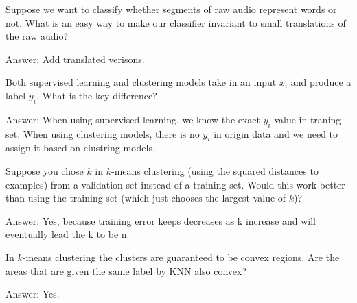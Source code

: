 \documentclass{article}
\def\ans#1{\par\gre{Answer: #1}}
\def\gre#1{{\color{gre}#1}}
\begin{document}
{\item Suppose we want to classify whether segments of raw audio represent words or not. What is an easy way to make our classifier invariant to small translations of the raw audio?
\ans{Add translated verisons.}
\item Both supervised learning and clustering models take in an input $x_i$ and produce a label $y_i$. What is the key difference?
\ans{When using supervised learning, we know the exact $y_i$ value in traning set. When using clustering models, there is no $y_i$ in origin data and we need to assign it based on clustring models.}
\item Suppose you chose $k$ in $k$-means clustering (using the squared distances to examples) from a validation set instead of a training set. Would this work better than using the training set (which just chooses the largest value of $k$)?
\ans{Yes, because training error keeps decreases as k increase and will eventually lead the k to be n.}
\item In $k$-means clustering the clusters are guaranteed to be convex regions. Are the areas that are given the same label by KNN also convex?
\ans{Yes.}
}
\end{document}
